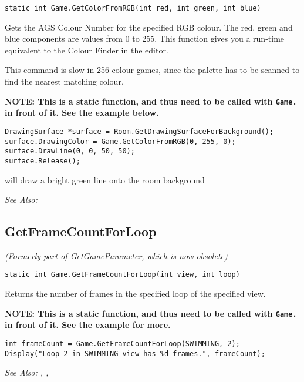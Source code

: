 \begin{verbatim}
static int Game.GetColorFromRGB(int red, int green, int blue)
\end{verbatim}
Gets the AGS Colour Number for the specified RGB colour. The red, green and blue
components are values from 0 to 255. This function gives you a run-time equivalent
to the Colour Finder in the editor.

This command is slow in 256-colour games, since the palette has to be scanned to find the
nearest matching colour.

\bf{NOTE:} This is a static function, and thus need to be called with \verb$Game.$ in front of it. See
the example below.

\begin{verbatim}
DrawingSurface *surface = Room.GetDrawingSurfaceForBackground();
surface.DrawingColor = Game.GetColorFromRGB(0, 255, 0);
surface.DrawLine(0, 0, 50, 50);
surface.Release();
\end{verbatim}
will draw a bright green line onto the room background

\it{See Also:} 


\subsection{GetFrameCountForLoop}\label{Game.GetFrameCountForLoop}%

\it{(Formerly part of GetGameParameter, which is now obsolete)}

\begin{verbatim}
static int Game.GetFrameCountForLoop(int view, int loop)
\end{verbatim}
Returns the number of frames in the specified loop of the specified view.

\bf{NOTE:} This is a static function, and thus need to be called with \verb$Game.$ in front of it. See
the example for more.

\begin{verbatim}
int frameCount = Game.GetFrameCountForLoop(SWIMMING, 2);
Display("Loop 2 in SWIMMING view has %d frames.", frameCount);
\end{verbatim}

\it{See Also:} ,
,


